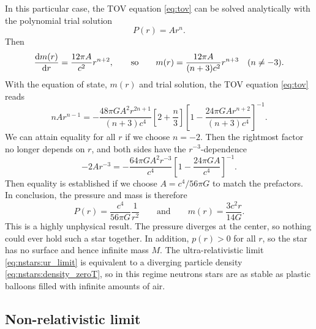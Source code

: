 In this particular case, the TOV equation \eqref{eq:tov} can be solved analytically with the polynomial trial solution
\begin{equation}
	P(r) = A r^n .
\label{eq:nstars:ur_ansatz}
\end{equation}
Then
\begin{equation}
	\odv{m(r)}{r} = \frac{12 \pi A}{c^2} r^{n+2},
	\qquad \text{so} \qquad
	m(r) = \frac{12 \pi A}{(n+3) c^2} r^{n+3}
	\quad (n \neq -3).
\end{equation}
With the equation of state, $m(r)$ and trial solution, the TOV equation \eqref{eq:tov} reads
\begin{equation}
	n A r^{n-1} =
	-\frac{48 \pi G A^2 r^{2n+1}}{(n+3) c^4} \left[ 2 + \frac{n}{3} \right] \left[ 1 - \frac{24 \pi G A r^{n+2}}{(n+3) c^4} \right]^{-1} .
\end{equation}
We can attain equality for all $r$ if we choose $n = -2$.
Then the rightmost factor no longer depends on $r$, and both sides have the $r^{-3}$-dependence
\begin{equation}
	- 2 A r^{-3} = - \frac{64 \pi G A^2 r^{-3}}{c^4} \left[ 1 - \frac{24 \pi G A}{c^4} \right]^{-1} .
\end{equation}
Then equality is established if we choose $A = c^4 / 56 \pi G$ to match the prefactors.
In conclusion, the pressure and mass is therefore
\begin{equation}
	P(r) = \frac{c^4}{56 \pi G} \frac{1}{r^2}
	\qquad \text{and} \qquad
	m(r) = \frac{3 c^2 r}{14 G}.
\end{equation}
This is a highly unphysical result.
The pressure diverges at the center, so nothing could ever hold such a star together.
In addition, $p(r) > 0$ for all $r$, so the star has no surface and hence infinite mass $M$.
The ultra-relativistic limit \eqref{eq:nstars:ur_limit} is equivalent to a diverging particle density \eqref{eq:nstars:density_zeroT}, so in this regime neutrons stars are as stable as plastic balloons filled with infinite amounts of air.

\subsection{Non-relativistic limit}
\label{sec:nstars:nr_limit}

